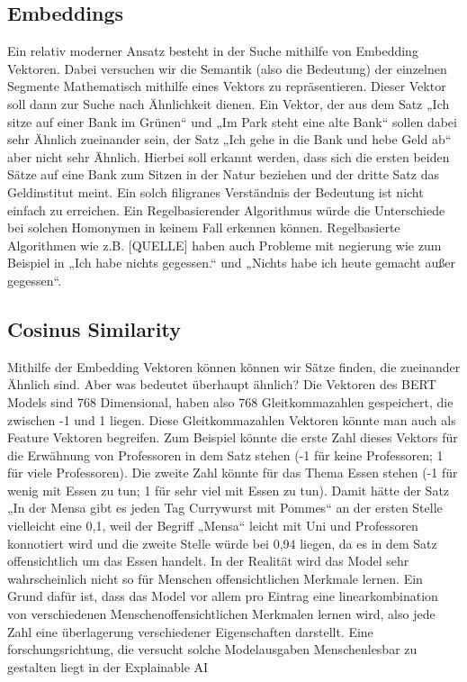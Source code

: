 \subsection{Embeddings}

Ein relativ moderner Ansatz besteht in der Suche mithilfe von Embedding Vektoren. Dabei versuchen wir die Semantik (also die Bedeutung) der einzelnen Segmente Mathematisch mithilfe eines Vektors zu repräsentieren. Dieser Vektor soll dann zur Suche nach Ähnlichkeit dienen. Ein Vektor, der aus dem Satz „Ich sitze auf einer Bank im Grünen“ und „Im Park steht eine alte Bank“ sollen dabei sehr Ähnlich zueinander sein, der Satz „Ich gehe in die Bank und hebe Geld ab“ aber nicht sehr Ähnlich. Hierbei soll erkannt werden, dass sich die ersten beiden Sätze auf eine Bank zum Sitzen in der Natur beziehen und der dritte Satz das Geldinstitut meint. Ein solch filigranes Verständnis der Bedeutung ist nicht einfach zu erreichen. 
Ein Regelbasierender Algorithmus würde die Unterschiede bei solchen Homonymen in keinem Fall erkennen können. Regelbasierte Algorithmen wie z.B. [QUELLE] haben auch Probleme mit negierung wie zum Beispiel in „Ich habe nichts gegessen.“ und „Nichts habe ich heute gemacht außer gegessen“.

\subsection{Cosinus Similarity}


Mithilfe der Embedding Vektoren können können wir Sätze finden, die zueinander Ähnlich sind. Aber was bedeutet überhaupt ähnlich? Die Vektoren des BERT Models sind 768 Dimensional, haben also 768 Gleitkommazahlen gespeichert, die zwischen -1 und 1 liegen. Diese Gleitkommazahlen Vektoren könnte man auch als Feature Vektoren begreifen. Zum Beispiel könnte die erste Zahl dieses Vektors für die Erwähnung von Professoren in dem Satz stehen (-1 für keine Professoren; 1 für viele Professoren). Die zweite Zahl könnte für das Thema Essen stehen (-1 für wenig mit Essen zu tun; 1 für sehr viel mit Essen zu tun). Damit hätte der Satz „In der Mensa gibt es jeden Tag Currywurst mit Pommes“ an der ersten Stelle vielleicht eine 0,1, weil der Begriff „Mensa“ leicht mit Uni und Professoren konnotiert wird und die zweite Stelle würde bei 0,94 liegen, da es in dem Satz offensichtlich um das Essen handelt. 
In der Realität wird das Model sehr wahrscheinlich nicht so für Menschen offensichtlichen Merkmale lernen. Ein Grund dafür ist, dass das Model vor allem pro Eintrag eine linearkombination von verschiedenen Menschenoffensichtlichen Merkmalen lernen wird, also jede Zahl eine überlagerung verschiedener Eigenschaften darstellt. 
Eine forschungsrichtung, die versucht solche Modelausgaben Menschenlesbar zu gestalten liegt in der Explainable AI

